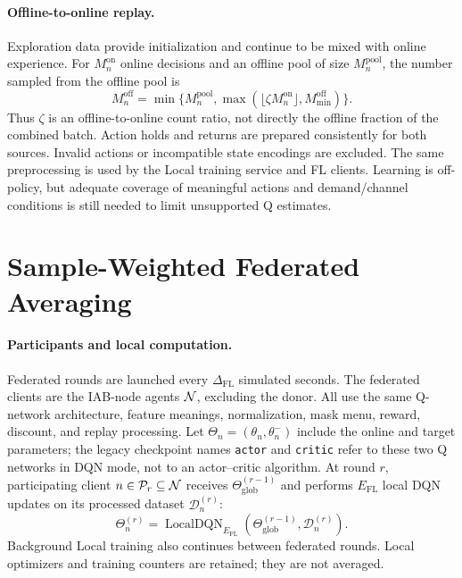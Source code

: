\begin{EnChapter}
\paragraph{Offline-to-online replay.}
Exploration data provide initialization and continue to be mixed with online
experience. For $M_n^{\mathrm{on}}$ online decisions and an offline pool of size
$M_n^{\mathrm{pool}}$, the number sampled from the offline pool is
\begin{equation}
  M_n^{\mathrm{off}}=\min\{M_n^{\mathrm{pool}},
              \max(\lfloor\zeta M_n^{\mathrm{on}}\rfloor,M_{\min}^{\mathrm{off}})\}.
  \label{eq:offline-mix}
\end{equation}
Thus $\zeta$ is an offline-to-online count ratio, not directly the offline
fraction of the combined batch. Action holds and returns are prepared
consistently for both sources. Invalid actions or incompatible state encodings
are excluded. The same preprocessing is used by the Local training service and
FL clients. Learning is off-policy, but adequate coverage of meaningful actions
and demand/channel conditions is still needed to limit unsupported Q estimates.

\section{Sample-Weighted Federated Averaging}
\label{subsec:fl}

\paragraph{Participants and local computation.}
Federated rounds are launched every $\Delta_{\mathrm{FL}}$ simulated seconds.
The federated clients are the IAB-node agents $\mathcal{N}$, excluding the donor.
All use the same Q-network architecture, feature meanings, normalization, mask
menu, reward, discount, and replay processing. Let
$\Theta_n=(\theta_n,\theta_n^-)$ include the online and target parameters; the
legacy checkpoint names \texttt{actor} and \texttt{critic} refer to these two
Q networks in DQN mode, not to an actor--critic algorithm.
At round $r$, participating client $n\in\mathcal{P}_r\subseteq\mathcal{N}$ receives
$\Theta_{\mathrm{glob}}^{(r-1)}$ and performs $E_{\mathrm{FL}}$ local DQN updates
on its processed dataset $\mathcal{D}_n^{(r)}$:
\begin{equation}
  \Theta_n^{(r)}=\operatorname{LocalDQN}_{E_{\mathrm{FL}}}
                 (\Theta_{\mathrm{glob}}^{(r-1)},\mathcal{D}_n^{(r)}).
\end{equation}
Background Local training also continues between federated rounds. Local
optimizers and training counters are retained; they are not averaged.


\end{EnChapter}
